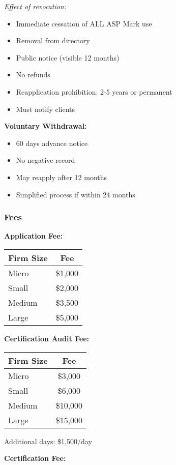 \documentclass[11pt,a4paper]{article}
\begin{document}
\textit{Effect of revocation:}
\begin{itemize}
\item Immediate cessation of ALL ASP Mark use
\item Removal from directory
\item Public notice (visible 12 months)
\item No refunds
\item Reapplication prohibition: 2-5 years or permanent
\item Must notify clients
\end{itemize}

\textbf{Voluntary Withdrawal:}
\begin{itemize}
\item 60 days advance notice
\item No negative record
\item May reapply after 12 months
\item Simplified process if within 24 months
\end{itemize}

\subsubsection{Fees}

\textbf{Application Fee:}

\begin{tabular}{|l|c|}
\hline
\textbf{Firm Size} & \textbf{Fee} \\
\hline
Micro & \$1,000 \\
Small & \$2,000 \\
Medium & \$3,500 \\
Large & \$5,000 \\
\hline
\end{tabular}

\textbf{Certification Audit Fee:}

\begin{tabular}{|l|c|}
\hline
\textbf{Firm Size} & \textbf{Fee} \\
\hline
Micro & \$3,000 \\
Small & \$6,000 \\
Medium & \$10,000 \\
Large & \$15,000 \\
\hline
\end{tabular}

Additional days: \$1,500/day

\textbf{Certification Fee:}
\end{document}
